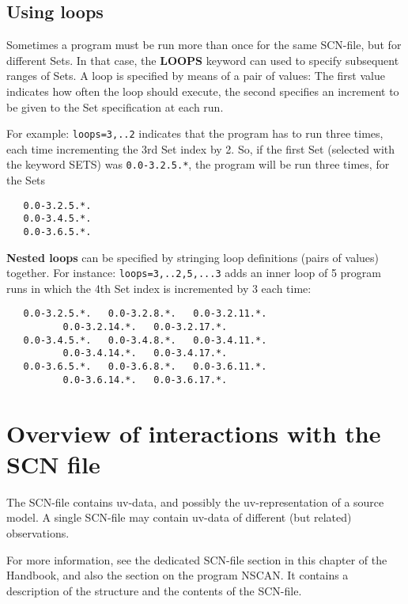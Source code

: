 
\subsection{Using loops} 
\label{loops} 

	Sometimes a program must be run more than once for the same 
SCN-file, but for different Sets.  In that case, the {\bf LOOPS} keyword can
used to specify subsequent ranges of Sets.  A loop is specified by means of a
pair of values: The first value indicates how often the loop should execute,
the second specifies an increment to be given to the Set specification at each
run. 

	For example: {\tt loops=3,..2} indicates that the program has to run
three times, each time incrementing the 3rd Set index by 2.  So, if the first 
Set (selected with the keyword SETS) was {\tt 0.0-3.2.5.*}, the program will be
run three times, for the Sets 

\begin{verbatim} 
   0.0-3.2.5.*.
   0.0-3.4.5.*.
   0.0-3.6.5.*.
\end{verbatim} 

{\bf Nested loops} can be specified by stringing loop definitions (pairs of
values) together.  For instance: {\tt loops=3,..2,5,...3} adds an inner loop of 
5 program runs in which the 4th Set index is incremented by 3 each time: 

\begin{verbatim} 
   0.0-3.2.5.*.   0.0-3.2.8.*.   0.0-3.2.11.*.
		  0.0-3.2.14.*.   0.0-3.2.17.*.
   0.0-3.4.5.*.   0.0-3.4.8.*.   0.0-3.4.11.*.
		  0.0-3.4.14.*.   0.0-3.4.17.*.
   0.0-3.6.5.*.   0.0-3.6.8.*.   0.0-3.6.11.*.
		  0.0-3.6.14.*.   0.0-3.6.17.*.
\end{verbatim} 


\section{Overview of interactions with the SCN file} 
\label{scn} 

	The SCN-file contains uv-data, and possibly the uv-representation of a
source model.  A single SCN-file may contain uv-data of different (but related)
observations. 

	For more information, see the dedicated SCN-file section in this
chapter of the Handbook, and also the section on the program NSCAN.  It
contains a description of the structure and the contents of the 
SCN-file. 


